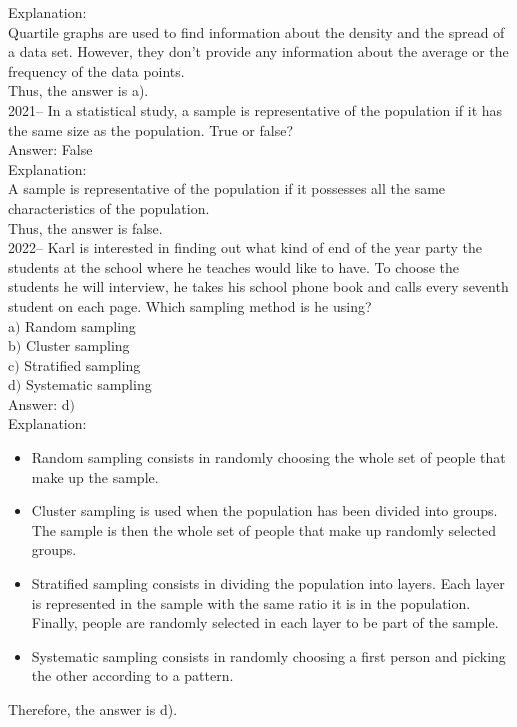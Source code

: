\documentclass[letterpaper, 12pt]{article}
\begin{document}
Explanation:\\
Quartile graphs are used to find information about the density and the spread of a data set. However, they don't provide any information about the average or the frequency of the data points.\\
Thus, the answer is a).\\

2021-- In a statistical study, a sample is representative of the population if it has the same size as the population. True or false?\\

Answer: False\\

Explanation:\\
A sample is representative of the population if it possesses all the same characteristics of the population.\\
Thus, the answer is false.\\


2022-- Karl is interested in finding out what kind of end of the year party the students at the school where he teaches would like to have. To choose the students he will interview, he takes his school phone book and calls every seventh student on each page. Which sampling method is he using?\\

a$)$ Random sampling\\
b$)$ Cluster sampling\\
c$)$ Stratified sampling\\
d$)$ Systematic sampling\\

Answer: d$)$\\

Explanation:\\
\begin{itemize}
 \item Random sampling consists in randomly choosing the whole set of people that make up the sample. \\
\item Cluster sampling is used when the population has been divided into groups. The sample is then the whole set of people that make up randomly selected groups.  \\
\item Stratified sampling consists in dividing the population into layers. Each layer is represented in the sample with the same ratio it is in the population. Finally, people are randomly selected in each layer to be part of the sample. \\
\item Systematic sampling consists in randomly choosing a first person and picking the other according to a pattern. \\
\end{itemize}
Therefore, the answer is d).\\
\end{document}
